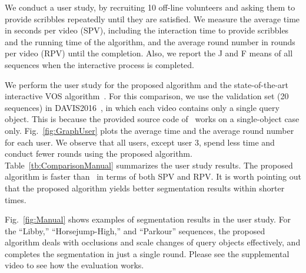\documentclass[runningheads]{llncs}
\begin{document}
We conduct a user study, by recruiting 10 off-line volunteers and asking them to provide scribbles repeatedly until they are satisfied. We measure the average time in seconds per video (SPV), including the interaction time to provide scribbles and the running time of the algorithm, and the average round number in rounds per video (RPV) until the completion. Also, we report the J and F means of all sequences when the interactive process is completed.

We perform the user study for the proposed algorithm and the state-of-the-art interactive VOS algorithm~\cite{Oh2019CVPR}. For this comparison, we use the validation set (20 sequences) in DAVIS2016~\cite{perazzi2016DAVIS}, in which each video contains only a single query object. This is because the provided source code of~\cite{Oh2019CVPR} works on a single-object case only. Fig.~\ref{fig:GraphUser} plots the average time and the average round number for each user. We observe that all users, except user 3, spend less time and conduct fewer rounds using the proposed algorithm. Table~\ref{tb:ComparisonManual} summarizes the user study results. The proposed algorithm is faster than~\cite{Oh2019CVPR} in terms of both SPV and RPV. It is worth pointing out that the proposed algorithm yields better segmentation results within shorter times.


Fig.~\ref{fig:Manual} shows examples of segmentation results in the user study. For the ``Libby,'' ``Horsejump-High,'' and ``Parkour'' sequences, the proposed algorithm deals with occlusions and scale changes of query objects effectively, and completes the segmentation in just a single round. Please see the supplemental video to see how the evaluation works.

\begin{comment}
Fig.~\ref{fig:ManualCapture} shows the user interface for the proposed interactive VOS system. It enables a user to perform interactive segmentation of a video frame with scribbles, transfer the results to other frames, and find the next frame that has poor results and thus is to be annotated. Please see the supplemental video to see how it works.


\begin{figure}[t]
\centering
    \texttt{[image: ./resource/Capture\_Manual.png]}
\caption{The user interface for the proposed interactive VOS system.}
\label{fig:ManualCapture}
\vspace{-0.3cm}
\end{figure}
\end{comment}
\end{document}

